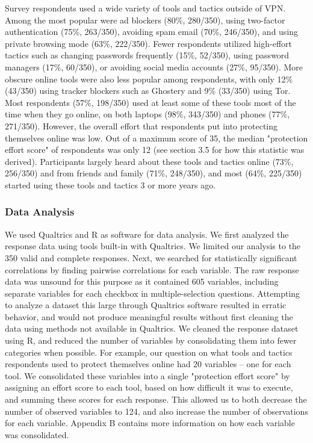 Survey respondents used a wide variety of tools and tactics outside of VPN.
Among the most popular were ad blockers (80\%, 280/350), using two-factor
authentication (75\%, 263/350), avoiding spam email (70\%, 246/350), and using
private browsing mode (63\%, 222/350). Fewer respondents utilized high-effort
tactics such as changing passwords frequently (15\%, 52/350), using password
managers (17\%, 60/350), or avoiding social media accounts (27\%, 95/350).
More obscure online tools were also less popular among respondents, with only
12\% (43/350) using tracker blockers such as Ghostery and 9\% (33/350) using
Tor. Most respondents (57\%, 198/350) used at least some of these tools most
of the time when they go online, on both laptops (98\%, 343/350) and phones
(77\%, 271/350). However, the overall effort that respondents put into
protecting themselves online was low. Out of a maximum score of 35, the median
"protection effort score" of respondents was only 12 (see section 3.5 for how
this statistic was derived). Participants largely heard about these tools and
tactics online (73\%, 256/350) and from friends and family (71\%, 248/350),
and most (64\%, 225/350) started using these tools and tactics 3 or more years
ago.

\subsubsection{Data Analysis}

We used Qualtrics and R as software for data analysis. We first analyzed the
response data using tools built-in with Qualtrics. We limited our analysis to
the 350 valid and complete responses.  Next, we searched for statistically
significant correlations by finding pairwise correlations for each variable.
The raw response data was unsound for this purpose as it contained 605
variables, including separate variables for each checkbox in
multiple-selection questions. Attempting to analyze a dataset this large
through Qualtrics software resulted in erratic behavior, and would not produce
meaningful results without first cleaning the data using methods not available
in Qualtrics. We cleaned the response dataset using R, and reduced the number
of variables by consolidating them into fewer categories when possible. For
example, our question on what tools and tactics respondents used to protect
themselves online had 20 variables -- one for each tool. We consolidated these
variables into a single "protection effort score" by assigning an effort score
to each tool, based on how difficult it was to execute, and summing these
scores for each response. This allowed us to both decrease the number of
observed variables to 124, and also increase the number of observations for
each variable. Appendix B contains more information on how each variable was
consolidated.


